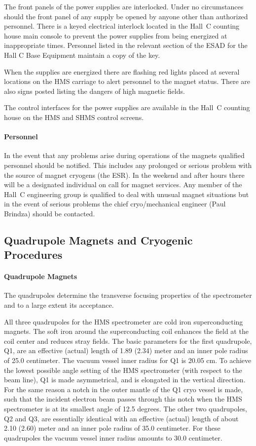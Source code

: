 {The front panels of the power supplies are interlocked. Under
no circumstances should the front panel of any supply be opened by anyone other
than authorized personnel. There is a keyed electrical interlock
located in the Hall~C counting house main console to prevent the
power supplies from being energized at inappropriate times.
Personnel listed in the relevant section of the ESAD for the Hall C
Base Equipment maintain a copy
of the key.

When the supplies are energized there are flashing red lights placed at
several locations on the HMS carriage to alert personnel to the magnet
status. There are also signs posted listing the dangers of high magnetic
fields.

The control interfaces for the power supplies are available in the 
Hall~C counting house on the HMS and SHMS control screens.

\paragraph{Personnel}
In the event that any problems arise during operations of the magnets
qualified personnel should be notified. This includes any prolonged
or serious problem with the source of magnet cryogens (the ESR).
In the weekend and after hours there
will be a designated individual on call for magnet services. Any member of
the Hall~C engineering group is qualified to deal with unusual magnet situations
but in the event of serious problems the chief cryo/mechanical engineer (Paul
Brindza) should be contacted.


\subsection{Quadrupole Magnets and Cryogenic Procedures}

\paragraph{Quadrupole Magnets}
The quadrupoles determine the transverse focusing properties of the spectrometer
and to a large extent its acceptance.

All three quadrupoles for the HMS spectrometer are cold iron superconducting
magnets. The soft iron around the superconducting coil enhances the field at
the coil center and reduces stray fields.
The basic parameters for the first quadrupole, Q1, are an effective (actual)
length of 1.89 (2.34) meter and an inner pole radius of
25.0 centimeter. \cite{bi:yan1}
The vacuum vessel
inner radius for Q1 is 20.05 cm. To achieve the lowest possible angle
setting of the HMS spectrometer (with respect to the beam line), Q1 is
made asymmetrical, and is elongated in the vertical direction. For the same
reason a notch in the outer mantle of the Q1 cryo vessel is made, such
that the incident electron beam passes through this notch when the
HMS spectrometer is at its smallest angle of 12.5 degrees.
The other two quadrupoles, Q2 and Q3, are essentially identical with an
effective (actual) length of about 2.10 (2.60) meter and an inner pole radius
of 35.0 centimeter. For these quadrupoles the vacuum vessel inner radius
amounts to 30.0 centimeter.

}

